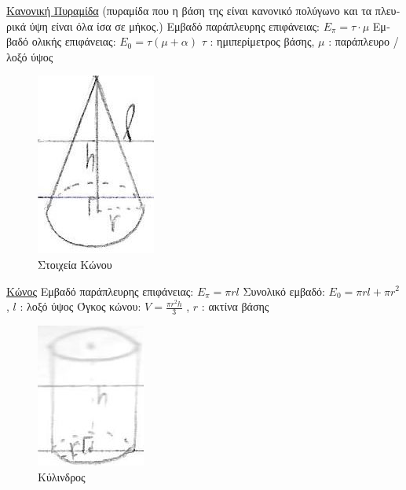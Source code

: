 \documentclass[12pt]{article}
\begin{document}
\begin{flushleft}
	\uline{\textgreek{Κανονική Πυραμίδα}} \linebreak 
	\textgreek{(πυραμίδα που η βάση της είναι κανονικό πολύγωνο και τα πλευρικά ύψη είναι όλα ίσα σε μήκος.)} \linebreak 
	\textbullet \quad \textgreek{Εμβαδό παράπλευρης επιφάνειας}: $\displaystyle E_\pi = \tau \cdot \mu $ \linebreak 
	\textbullet \quad \textgreek{Εμβαδό ολικής επιφάνειας}: $\displaystyle E_0 = \tau(\mu + \alpha) $ \linebreak  
	$\tau$  :  \textgreek{ημιπερίμετρος βάσης}, $\mu$  :  \textgreek{παράπλευρο / λοξό ύψος} \linebreak
	
	\begin{figure}[H]
	\centering
	\includegraphics[scale=2]{cone}
	\caption{\textgreek{Στοιχεία Κώνου}}
	\label{fig:cone}
	\end{figure}	
			
	\uline{\textgreek{Κώνος}} \linebreak 
	\textbullet \quad \textgreek{Εμβαδό παράπλευρης επιφάνειας}: $\displaystyle E_\pi = \pi r l $ \linebreak  
	\textbullet \quad  \textgreek{Συνολικό εμβαδό}: $\displaystyle E_0 = \pi rl + \pi r^2 $ , $l$  :  \textgreek{λοξό ύψος} \linebreak 
	\textbullet \quad \textgreek{Όγκος κώνου}: $\displaystyle V = \frac{\pi r^2 h}{3} $ , $r$  :  \textgreek{ακτίνα βάσης} \linebreak  

	\begin{figure}[H]
	\centering
	\includegraphics[scale=2]{cylinder}
	\caption{\textgreek{Κύλινδρος}}
	\label{fig:cylinder}
	\end{figure}	
	

\end{flushleft}
\end{document}
